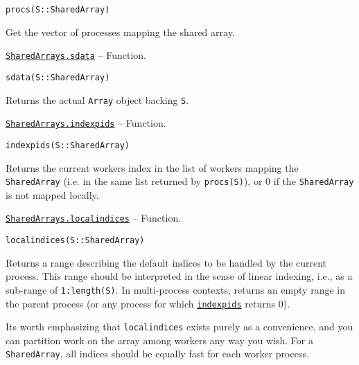 \begin{adjustwidth}{2em}{0pt}


\begin{verbatim}
procs(S::SharedArray)
\end{verbatim}

Get the vector of processes mapping the shared array.



\end{adjustwidth}
\hypertarget{5828642841105091437}{} 
\hyperlink{5828642841105091437}{\texttt{SharedArrays.sdata}}  -- {Function.}

\begin{adjustwidth}{2em}{0pt}


\begin{verbatim}
sdata(S::SharedArray)
\end{verbatim}

Returns the actual \texttt{Array} object backing \texttt{S}.



\end{adjustwidth}
\hypertarget{6331641514330199981}{} 
\hyperlink{6331641514330199981}{\texttt{SharedArrays.indexpids}}  -- {Function.}

\begin{adjustwidth}{2em}{0pt}


\begin{verbatim}
indexpids(S::SharedArray)
\end{verbatim}

Returns the current worker{\textquotesingle}s index in the list of workers mapping the \texttt{SharedArray} (i.e. in the same list returned by \texttt{procs(S)}), or 0 if the \texttt{SharedArray} is not mapped locally.



\end{adjustwidth}
\hypertarget{12447667054613272081}{} 
\hyperlink{12447667054613272081}{\texttt{SharedArrays.localindices}}  -- {Function.}

\begin{adjustwidth}{2em}{0pt}


\begin{verbatim}
localindices(S::SharedArray)
\end{verbatim}

Returns a range describing the {\textquotedbl}default{\textquotedbl} indices to be handled by the current process.  This range should be interpreted in the sense of linear indexing, i.e., as a sub-range of \texttt{1:length(S)}.  In multi-process contexts, returns an empty range in the parent process (or any process for which \hyperlink{6331641514330199981}{\texttt{indexpids}} returns 0).

It{\textquotesingle}s worth emphasizing that \texttt{localindices} exists purely as a convenience, and you can partition work on the array among workers any way you wish. For a \texttt{SharedArray}, all indices should be equally fast for each worker process.



\end{adjustwidth}

